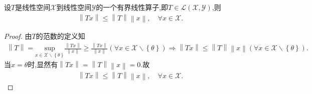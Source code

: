 \documentclass[../../main.tex]{subfiles}%
\begin{document}
\begin{proposition}\label{proposition:有界线性算子的基本不等式}
设$T$是线性空间$\mathscr{X}$到线性空间$\mathscr{Y}$的一个有界线性算子,即$T\in \mathscr{L}(\mathscr{X},\mathscr{Y})$,则
\begin{align*}
\left\| Tx \right\| \leqslant \left\| T \right\| \left\| x \right\| ,\quad \forall x\in \mathscr{X} .
\end{align*}
\end{proposition}
\begin{proof}

由$T$的范数的定义知
\begin{align*}
\left\| T \right\| =\underset{x\in \mathscr{X} \backslash \left\{ \theta \right\}}{\mathrm{sup}}\frac{\left\| Tx \right\|}{\left\| x \right\|}\geqslant \frac{\left\| Tx \right\|}{\left\| x \right\|}\left( \forall x\in \mathscr{X} \backslash \left\{ \theta \right\} \right) \Longrightarrow \left\| Tx \right\| \leqslant \left\| T \right\| \left\| x \right\| \left( \forall x\in \mathscr{X} \backslash \left\{ \theta \right\} \right) .
\end{align*}
当$x=\theta$时,显然有$\left\| Tx \right\| =\left\| T \right\| \left\| x \right\| =0.$故
\begin{align*}
\left\| Tx \right\| \leqslant \left\| T \right\| \left\| x \right\| ,\quad \forall x\in \mathscr{X} .
\end{align*}

\end{proof}
\end{document}

